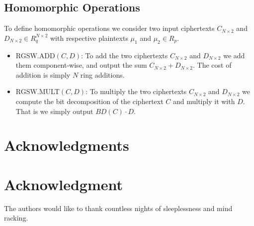 \documentclass[10pt,journal,compsoc]{IEEEtran}
\theoremstyle{definition}
\begin{document}
\subsection{Homomorphic Operations}

To define homomorphic operations we consider two input ciphertexts $C_{N\times 2}$ and $D_{N\times 2} \in R_q^{N\times 2}$ with respective plaintexts $\mu_1$ and $\mu_2 \in R_p$.

\begin{itemize}
\item RGSW.ADD$\left(C,D\right)$: To add the two ciphertexts $C_{N\times 2}$ and $D_{N\times 2}$ we add them component-wise, and output the sum $C_{N\times 2} + D_{N\times 2}$. The cost of addition is simply $N$ ring additions.
\item RGSW.MULT$\left(C,D\right)$: To multiply the two ciphertexts $C_{N\times 2}$ and $D_{N\times 2}$ we compute the bit decomposition of the ciphertext $C$ and multiply it with $D$. That is we simply output $BD\left(C\right)\cdot D.$
\end{itemize}

\appendices



\ifCLASSOPTIONcompsoc
  \section*{Acknowledgments}
\else
  \section*{Acknowledgment}
\fi


The authors would like to thank countless nights of sleeplessness and mind racking.


\ifCLASSOPTIONcaptionsoff
  \newpage
\fi




\end{document}

